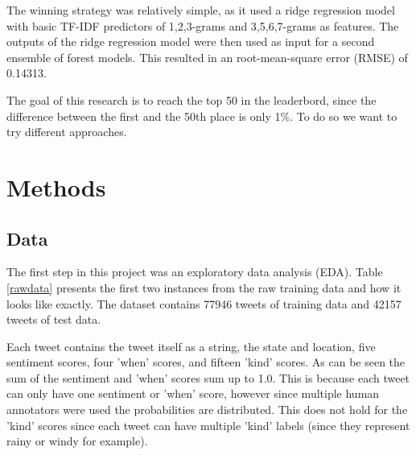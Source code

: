 \documentclass[11pt]{article}
\begin{document}
The winning strategy was relatively simple, as it used a ridge regression model with basic TF-IDF predictors of 1,2,3-grams and 3,5,6,7-grams as features. The outputs of the ridge regression model were then used as input for a second ensemble of forest models. This resulted in an root-mean-square error (RMSE) of 0.14313. 

The goal of this research is to reach the top 50 in the leaderbord, since the difference between the first and the 50th place is only 1\%. To do so we want to try different approaches.

\section{Methods}
\subsection{Data}
The first step in this project was an exploratory data analysis (EDA). Table \ref{rawdata} presents the first two instances from the raw training data and how it looks like exactly. The dataset contains 77946 tweets of training data and 42157 tweets of test data. 
\begin{table}[t]
\begin{minipage}{\textwidth}
\centering
{}
\caption{Raw data}
\label{rawdata}
\end{minipage}
\end{table}
Each tweet contains the tweet itself as a string, the state and location, five sentiment scores, four 'when' scores, and fifteen 'kind' scores.
As can be seen the sum of the sentiment and 'when' scores sum up to 1.0. This is because each tweet can only have one sentiment or 'when' score, however since multiple human annotators were used the probabilities are distributed. This does not hold for the 'kind' scores since each tweet can have multiple 'kind' labels (since they represent rainy or windy for example).
\end{document}

